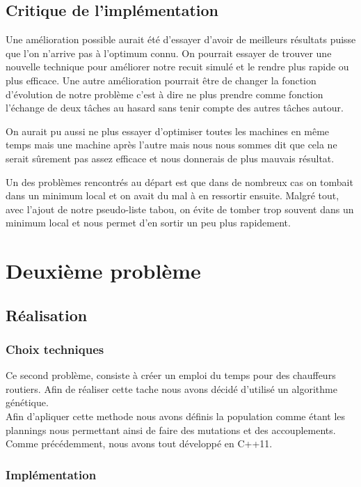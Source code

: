 \documentclass{report}
\begin{document}
\section{Critique de l'implémentation}
Une amélioration possible aurait été d'essayer d'avoir de meilleurs résultats puisse que l'on n'arrive pas à l'optimum connu. On pourrait essayer de trouver une nouvelle technique pour améliorer notre recuit simulé et le rendre plus rapide ou plus efficace. Une autre amélioration pourrait être de changer la fonction d'évolution de notre problème c'est à dire ne plus prendre comme fonction l'échange de deux tâches au hasard sans tenir compte des autres tâches autour.

On aurait pu aussi ne plus essayer d'optimiser toutes les machines en même temps mais une machine après l'autre mais nous nous sommes dit que cela ne serait sûrement pas assez efficace et nous donnerais de plus mauvais résultat.

Un des problèmes rencontrés au départ est que dans de nombreux cas on tombait dans un minimum local et on avait du mal à en ressortir ensuite.  Malgré tout, avec l'ajout de notre pseudo-liste tabou, on évite de tomber trop souvent dans un minimum local et nous permet d'en sortir un peu plus rapidement.

\newpage

\chapter{Deuxième problème}
\minitoc
\section{Réalisation}
\subsection{Choix techniques}
Ce second problème, consiste à créer un emploi du temps pour des chauffeurs routiers. Afin de réaliser cette tache nous avons décidé
d'utilisé un algorithme génétique.\\
Afin d'apliquer cette methode nous avons définis la population comme étant les plannings nous permettant ainsi de faire des mutations et
des accouplements. Comme précédemment, nous avons tout développé en C++11.

\subsection{Implémentation}
\end{document}
